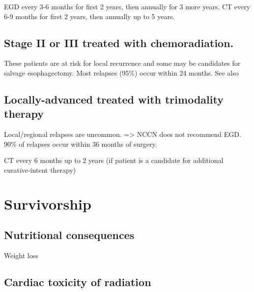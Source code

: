 \documentclass[
]{book}
\begin{document}
EGD every 3-6 months for first 2 years, then annually for 3 more years.
CT every 6-9 months for first 2 years, then annually up to 5 years.

\hypertarget{stage-ii-or-iii-treated-with-chemoradiation.}{%
\section{Stage II or III treated with chemoradiation.}\label{stage-ii-or-iii-treated-with-chemoradiation.}}

These patients are at risk for local recurrence \citep{sudo3400} and some may be candidates for salvage esophagectomy. Most relapses (95\%) occur within 24 months. See also \citep{taketa1139}

\hypertarget{locally-advanced-treated-with-trimodality-therapy}{%
\section{Locally-advanced treated with trimodality therapy}\label{locally-advanced-treated-with-trimodality-therapy}}

Local/regional relapses are uncommon. \citep{dorth2099} \citep{oppedijk385} \citep{sudo4306} =\textgreater{} NCCN does not recommend EGD. 90\% of relapses occur within 36 months of surgery.

CT every 6 months up to 2 years (if patient is a candidate for additional curative-intent therapy)

\hypertarget{eso_survivorship}{%
\chapter{Survivorship}\label{eso_survivorship}}

\hypertarget{nutritional-consequences}{%
\section{Nutritional consequences}\label{nutritional-consequences}}

\citep{baker987}

Weight loss
\citep{martin1308}
\citep{ouattara1088}

\hypertarget{cardiac-toxicity-of-radiation}{%
\section{Cardiac toxicity of radiation}\label{cardiac-toxicity-of-radiation}}
\end{document}
